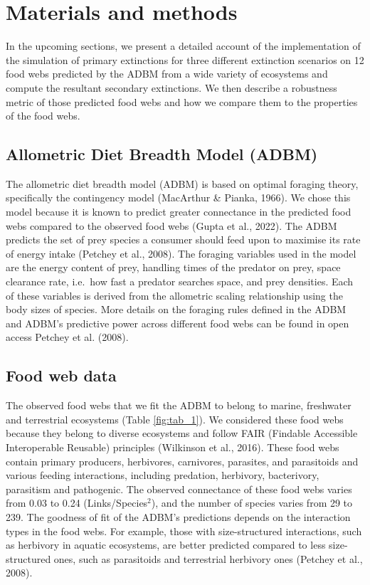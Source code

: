 \documentclass{article}
\begin{document}
\hypertarget{materials-and-methods}{%
\section{Materials and methods}\label{materials-and-methods}}

In the upcoming sections, we present a detailed account of the
implementation of the simulation of primary extinctions for three
different extinction scenarios on 12 food webs predicted by the ADBM
from a wide variety of ecosystems and compute the resultant secondary
extinctions. We then describe a robustness metric of those predicted
food webs and how we compare them to the properties of the food webs.

\hypertarget{allometric-diet-breadth-model-adbm}{%
\subsection{Allometric Diet Breadth Model
(ADBM)}\label{allometric-diet-breadth-model-adbm}}

The allometric diet breadth model (ADBM) is based on optimal foraging
theory, specifically the contingency model (MacArthur \& Pianka, 1966).
We chose this model because it is known to predict greater connectance
in the predicted food webs compared to the observed food webs (Gupta et
al., 2022). The ADBM predicts the set of prey species a consumer should
feed upon to maximise its rate of energy intake (Petchey et al., 2008).
The foraging variables used in the model are the energy content of prey,
handling times of the predator on prey, space clearance rate, i.e.~how
fast a predator searches space, and prey densities. Each of these
variables is derived from the allometric scaling relationship using the
body sizes of species. More details on the foraging rules defined in the
ADBM and ADBM's predictive power across different food webs can be found
in open access Petchey et al. (2008).

\hypertarget{food-web-data}{%
\subsection{Food web data}\label{food-web-data}}

The observed food webs that we fit the ADBM to belong to marine,
freshwater and terrestrial ecosystems (Table \ref{fig:tab_1}). We
considered these food webs because they belong to diverse ecosystems and
follow FAIR (Findable Accessible Interoperable Reusable) principles
(Wilkinson et al., 2016). These food webs contain primary producers,
herbivores, carnivores, parasites, and parasitoids and various feeding
interactions, including predation, herbivory, bacterivory, parasitism
and pathogenic. The observed connectance of these food webs varies from
0.03 to 0.24 (Links/Species\(^2\)), and the number of species varies
from 29 to 239. The goodness of fit of the ADBM's predictions depends on
the interaction types in the food webs. For example, those with
size-structured interactions, such as herbivory in aquatic ecosystems,
are better predicted compared to less size-structured ones, such as
parasitoids and terrestrial herbivory ones (Petchey et al., 2008).
\end{document}
